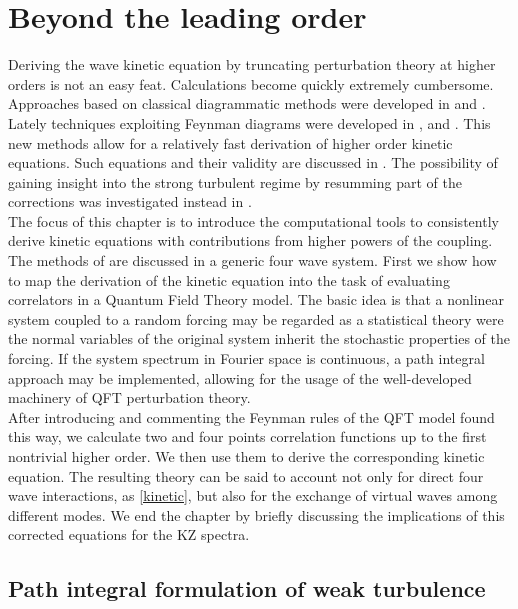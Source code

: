 
\newpage
\phantom{}
\thispagestyle{empty}
\section{Beyond the leading order}
Deriving the wave kinetic equation by truncating perturbation theory at higher orders is not an easy feat. Calculations become quickly extremely cumbersome. Approaches 
based on classical diagrammatic methods were developed in \cite{Zakharov1975} and \cite{Gurarie:1994ut}. Lately techniques exploiting Feynman diagrams were developed in
\cite{Rosenhaus2023}, \cite{Rosenhaus:2022uwa} and \cite{Rosenhaus:2023sik}. This new methods allow for a relatively fast derivation of higher order kinetic equations.
Such equations and their validity are discussed in \cite{Rosenhaus:2023pdj}. The possibility of gaining insight into the strong turbulent regime by resumming 
part of the corrections was investigated instead in \cite{Rosenhaus:2025mgj}. \\
The focus of this chapter is to introduce the computational tools to consistently derive kinetic equations with contributions from higher powers of the coupling. 
The methods of \cite{Rosenhaus2023} are discussed in a generic four wave system. First we show how to map the derivation of the kinetic equation into
the task of evaluating correlators in a Quantum Field Theory model. The basic idea is that a nonlinear system coupled to a random forcing may be regarded as 
a statistical theory were the normal variables of the original system inherit the stochastic properties of the forcing. If the system spectrum in Fourier space is continuous,
a path integral approach may be implemented, allowing for the usage of the well-developed machinery of QFT perturbation theory.\\
After introducing and commenting the Feynman rules of the QFT model found this way, we calculate two and four points 
correlation functions up to the first nontrivial higher order. We then use them to derive the corresponding kinetic equation. The resulting theory can be said to account 
not only for direct four wave interactions, as \eqref{kinetic}, but also for the exchange of virtual waves among different modes. We end the chapter by briefly discussing the implications
of this corrected equations for the KZ spectra. \\  
\subsection{Path integral formulation of weak turbulence}

